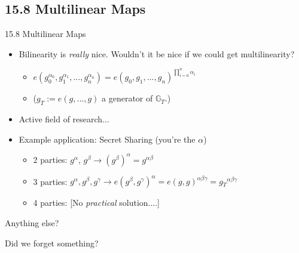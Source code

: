 \documentclass[aspectratio=169,xcolor=dvipsnames]{beamer}
\newcommand{\Gt}{\mathbb{G}_T}
\begin{document}
\subsection{15.8 Multilinear Maps}
\begin{frame}{15.8 Multilinear Maps}
\begin{itemize}
    \item Bilinearity is \textit{really} nice. Wouldn't it be nice if we could get multilinearity?
    \begin{itemize}
        \item $e(g_{0}^{\alpha_0}, g_{1}^{\alpha_1}, ..., g_{n}^{\alpha_n}) = e(g_0, g_1, ..., g_n)^{\prod^{n}_{i=0} \alpha_i}$
        \item ($g_T := e(g, ..., g)$ a generator of $\Gt$.) 
    \end{itemize}
    \item Active field of research...
    \item Example application: Secret Sharing (you're the $\alpha$)
    \begin{itemize}
        \item 2 parties: $g^\alpha$, $g^\beta \rightarrow (g^\beta)^\alpha = g^{\alpha \beta}$
        \item 3 parties: $g^\alpha, g^\beta, g^\gamma \rightarrow e(g^\beta, g^\gamma)^\alpha = e(g,g)^{\alpha \beta \gamma} =  g{_T}^{\alpha \beta \gamma}$
        \item 4 parties: [No \textit{practical} solution....]
    \end{itemize}
\end{itemize}
\end{frame}

\begin{frame}{Anything else?}
    \Huge{\centerline{Did we forget something?}}
\end{frame}
\end{document}
